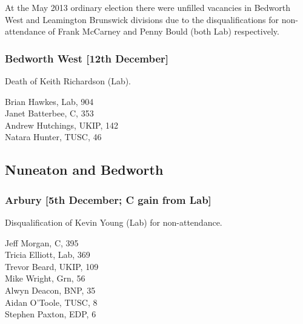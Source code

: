 \documentclass[a4paper,openany,10pt]{book}
\begin{document}
At the May 2013 ordinary election there were unfilled vacancies in Bedworth West and Leamington Brunswick divisions due to the disqualifications for non-attendance of Frank McCarney and Penny Bould (both Lab) respectively.


\subsubsection*{Bedworth West \hspace*{\fill}\nolinebreak[1]%
\enspace\hspace*{\fill}
[12th December]}


Death of Keith Richardson (Lab).



Brian Hawkes, Lab, 904\\
Janet Batterbee, C, 353\\
Andrew Hutchings, UKIP, 142\\
Natara Hunter, TUSC, 46\\


\subsection*{Nuneaton and Bedworth}

\subsubsection*{Arbury \hspace*{\fill}\nolinebreak[1]%
\enspace\hspace*{\fill}
[5th December; C gain from Lab]}


Disqualification of Kevin Young (Lab) for non-attendance.



Jeff Morgan, C, 395\\
Tricia Elliott, Lab, 369\\
Trevor Beard, UKIP, 109\\
Mike Wright, Grn, 56\\
Alwyn Deacon, BNP, 35\\
Aidan O'Toole, TUSC, 8\\
Stephen Paxton, EDP, 6\\
\end{document}
